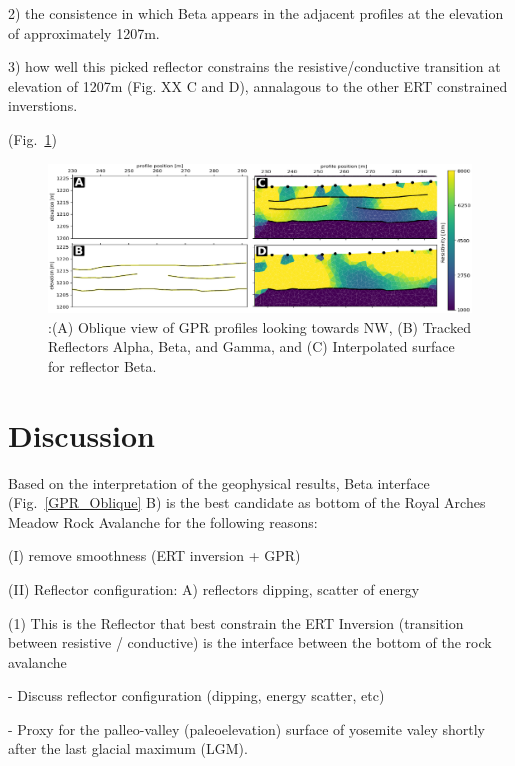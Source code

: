 \documentclass[5p]{elsarticle}
\begin{document}
2) the consistence in which Beta appears in the adjacent profiles at the elevation of approximately 1207m.

3) how well this picked reflector constrains the resistive/conductive transition at elevation of 1207m (Fig. XX C and D), annalagous to the other ERT constrained inverstions. 
								   
				(Fig.~\ref{Combined_ABCD})			

                                \begin{figure}[h]

	\includegraphics[width=\textwidth]{Figures/Combined_ABCD.pdf}
		\caption{:(A) Oblique view of GPR profiles looking towards NW, (B) Tracked Reflectors Alpha, Beta, and Gamma, and (C) Interpolated surface for reflector Beta. \label{Combined_ABCD}}

								   \end{figure}


\bigskip  


\section{Discussion}

Based on the interpretation of the geophysical results, Beta interface (Fig.~\ref{GPR_Oblique} B) is the best candidate as bottom of the Royal Arches Meadow Rock Avalanche for the following reasons: 


(I) remove smoothness (ERT inversion + GPR)


(II) Reflector configuration: A) reflectors dipping, scatter of energy 

	(1) This is the Reflector that best constrain the ERT Inversion (transition between resistive / 	conductive) is the interface between the bottom of the rock avalanche


- Discuss reflector configuration (dipping, energy scatter, etc) 


- Proxy for the palleo-valley (paleoelevation)  surface of yosemite valey shortly after the last glacial maximum (LGM).
\end{document}
